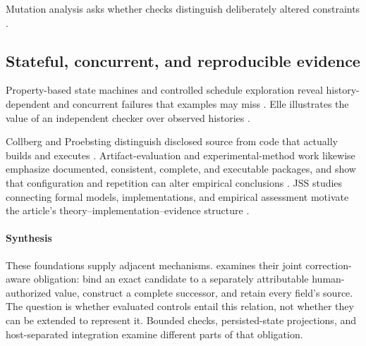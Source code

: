 Mutation analysis asks whether checks distinguish deliberately altered constraints \citep{sullivan2017alloymutation,jia2011mutation,just2014mutants}.

\subsection{Stateful, concurrent, and reproducible evidence}

Property-based state machines and controlled schedule exploration reveal history-dependent and concurrent failures that examples may miss \citep{claessen2000quickcheck,claessen2009pulse,musuvathi2008chess}. Elle illustrates the value of an independent checker over observed histories \citep{kingsbury2020elle}.

Collberg and Proebsting distinguish disclosed source from code that actually builds and executes \citep{collberg2016repeatability}. Artifact-evaluation and experimental-method work likewise emphasize documented, consistent, complete, and executable packages, and show that configuration and repetition can alter empirical conclusions \citep{hermann2020artifacts,klees2018fuzz,kessel2024openscience,liu2024artifacts}. JSS studies connecting formal models, implementations, and empirical assessment motivate the article's theory--implementation--evidence structure \citep{stachtiari2018correctness,alam2021dbverify,song2023continuous,coppa2024concolic}.

\paragraph{Synthesis}
These foundations supply adjacent mechanisms. \system{} examines their joint correction-aware obligation: bind an exact candidate to a separately attributable human-authorized value, construct a complete successor, and retain every field's source. The question is whether evaluated controls entail this relation, not whether they can be extended to represent it. Bounded checks, persisted-state projections, and host-separated integration examine different parts of that obligation.

